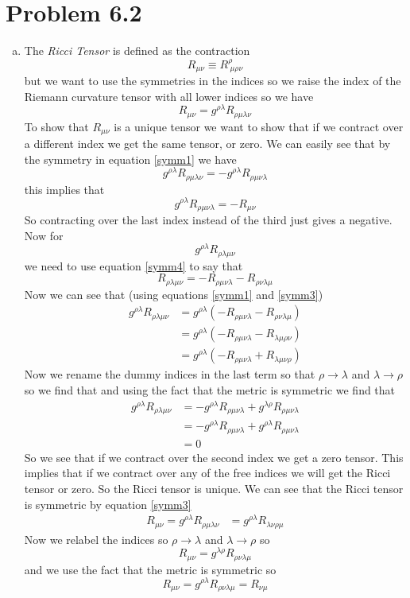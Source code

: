 \documentclass[11pt]{article}
\numberwithin{equation}{section}
\newcommand{\HWnum}{6}
\begin{document}
\section{Problem \HWnum.2}
\begin{enumerate}[(a)]
\item
The \emph{Ricci Tensor} is defined as the contraction
$$R_{\mu\nu} \equiv R^{\rho}_{\ \mu\rho\nu}$$
but we want to use the symmetries in the indices so we raise the index of the Riemann curvature tensor with all lower indices so we have
\begin{equation}
R_{\mu\nu} = g^{\rho\lambda}R_{\rho\mu\lambda\nu}
\label{Ricci}
\end{equation}
To show that $R_{\mu\nu}$ is a unique tensor we want to show that if we contract over a different index we get the same tensor, or zero. We can easily see that by the symmetry in equation \ref{symm1} we have
$$g^{\rho\lambda}R_{\rho\mu\lambda\nu} = -g^{\rho\lambda}R_{\rho\mu\nu\lambda}$$
this implies that
$$g^{\rho\lambda}R_{\rho\mu\nu\lambda} = -R_{\mu\nu}$$
So contracting over the last index instead of the third just gives a negative. Now for
$$g^{\rho\lambda}R_{\rho\lambda\mu\nu}$$
we need to use equation \ref{symm4} to say that
$$R_{\rho\lambda\mu\nu} = -R_{\rho\mu\nu\lambda} - R_{\rho\nu\lambda\mu}$$
Now we can see that (using equations \ref{symm1} and \ref{symm3})
\begin{align*}
g^{\rho\lambda}R_{\rho\lambda\mu\nu} &= g^{\rho\lambda}\left(-R_{\rho\mu\nu\lambda} - R_{\rho\nu\lambda\mu}\right)\\
&= g^{\rho\lambda}\left(-R_{\rho\mu\nu\lambda} - R_{\lambda\mu\rho\nu}\right)\\
&= g^{\rho\lambda}\left(-R_{\rho\mu\nu\lambda} + R_{\lambda\mu\nu\rho}\right)
\end{align*}
Now we rename the dummy indices in the last term so that $\rho\rightarrow\lambda$ and $\lambda\rightarrow\rho$ so we find that and using the fact that the metric is symmetric we find that
\begin{align*}
g^{\rho\lambda}R_{\rho\lambda\mu\nu} &= -g^{\rho\lambda}R_{\rho\mu\nu\lambda} + g^{\lambda\rho}R_{\rho\mu\nu\lambda}\\
&= -g^{\rho\lambda}R_{\rho\mu\nu\lambda} + g^{\rho\lambda}R_{\rho\mu\nu\lambda}\\
&= 0
\end{align*}
So we see that if we contract over the second index we get a zero tensor. This implies that if we contract over any of the free indices we will get the Ricci tensor or zero. So the Ricci tensor is unique. We can see that the Ricci tensor is symmetric by equation \ref{symm3}
\begin{align*}
R_{\mu\nu} = g^{\rho\lambda}R_{\rho\mu\lambda\nu} &= g^{\rho\lambda}R_{\lambda\nu\rho\mu}
\end{align*}
Now we relabel the indices so $\rho\rightarrow\lambda$ and $\lambda\rightarrow\rho$ so
$$R_{\mu\nu} = g^{\lambda\rho}R_{\rho\nu\lambda\mu}$$
and we use the fact that the metric is symmetric so
$$R_{\mu\nu} = g^{\rho\lambda}R_{\rho\nu\lambda\mu} = R_{\nu\mu}$$


\end{enumerate}
\end{document}
